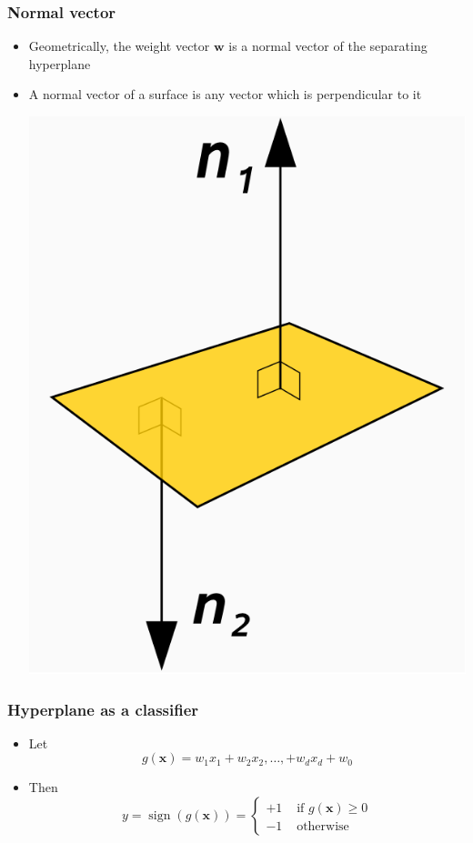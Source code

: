 \documentclass[14pt,mathserif,dvipsnames,usenames]{beamer}
\DeclareMathOperator*{\sign}{sign}
\newcommand{\x}{\mathbf{x}}
\newcommand{\w}{\mathbf{w}}
\newcommand{\voc}[1]{{\color{ForestGreen}#1}}
\begin{document}
\begin{frame}
 \frametitle{Normal vector}
\begin{itemize}
\item Geometrically, the weight vector $\w$ is a \voc{normal vector}
  of the separating hyperplane
\item A normal vector of a surface is any vector which is
  perpendicular to it
\begin{center}
 \includegraphics[scale=0.2]{Normal_vectors2.png}
 \end{center}
\end{itemize}
\end{frame}


 \begin{frame}\frametitle{Hyperplane as a classifier}
   \begin{itemize}
   \item Let \[
     g(\x) =  w_1x_1 + w_2x_2, \ldots, + w_dx_d + w_0
     \]
 \item Then
   \[ y = \sign( g(\x) ) =
   \begin{cases}
    +1 & \text{ if } g(\x) \geq 0\\
    -1 & \text{ otherwise }
   \end{cases}
 \]
   \end{itemize}
 \end{frame}
\end{document}
